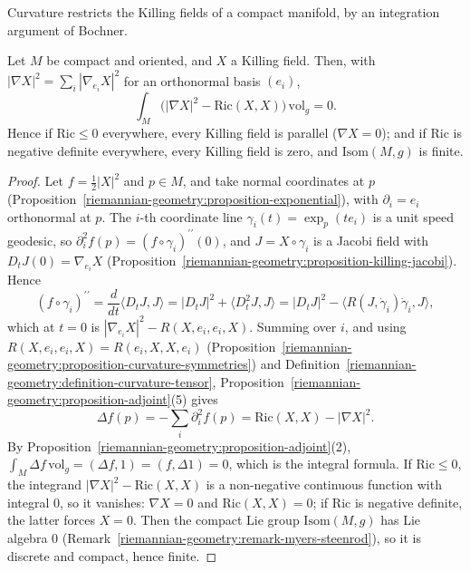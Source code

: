 Curvature restricts the Killing fields of a compact manifold, by an integration argument of Bochner.

\begin{theorem}[Bochner]\label{riemannian-geometry:theorem-bochner-killing}
Let $M$ be compact and oriented, and $X$ a Killing field. Then, with $|\nabla X|^2 = \sum_i|\nabla_{e_i}X|^2$ for an orthonormal basis $(e_i)$,
\[
\int_M\bigl(|\nabla X|^2 - \mathrm{Ric}(X, X)\bigr)\,\mathrm{vol}_g = 0 .
\]
Hence if $\mathrm{Ric} \leq 0$ everywhere, every Killing field is parallel ($\nabla X = 0$); and if $\mathrm{Ric}$ is negative definite everywhere, every Killing field is zero,
and $\mathrm{Isom}(M, g)$ is finite.
\end{theorem}

\begin{proof}
Let $f = \frac12|X|^2$ and $p \in M$, and take normal coordinates at $p$ (Proposition~\ref{riemannian-geometry:proposition-exponential}), with
$\partial_i = e_i$ orthonormal at $p$. The $i$-th coordinate line $\gamma_i(t) = \exp_p(te_i)$ is a unit speed geodesic, so $\partial_i^2f(p) = (f \circ \gamma_i)^{\prime\prime}(0)$,
and $J = X \circ \gamma_i$ is a Jacobi field with $D_tJ(0) = \nabla_{e_i}X$ (Proposition~\ref{riemannian-geometry:proposition-killing-jacobi}). Hence
\[
(f \circ \gamma_i)^{\prime\prime} = \frac{d}{dt}\langle D_tJ, J\rangle = |D_tJ|^2 + \langle D_t^2J, J\rangle = |D_tJ|^2 - \langle R(J, \dot\gamma_i)\dot\gamma_i, J\rangle,
\]
which at $t = 0$ is $|\nabla_{e_i}X|^2 - R(X, e_i, e_i, X)$. Summing over $i$, and using $R(X, e_i, e_i, X) = R(e_i, X, X, e_i)$
(Proposition~\ref{riemannian-geometry:proposition-curvature-symmetries}) and Definition~\ref{riemannian-geometry:definition-curvature-tensor}, Proposition~\ref{riemannian-geometry:proposition-adjoint}(5)
gives
\[
\Delta f(p) = -\sum_i\partial_i^2f(p) = \mathrm{Ric}(X, X) - |\nabla X|^2 .
\]
By Proposition~\ref{riemannian-geometry:proposition-adjoint}(2), $\int_M\Delta f\,\mathrm{vol}_g = (\Delta f, 1) = (f, \Delta1) = 0$, which is the integral formula. If
$\mathrm{Ric} \leq 0$, the integrand $|\nabla X|^2 - \mathrm{Ric}(X, X)$ is a non-negative continuous function with integral $0$, so it vanishes: $\nabla X = 0$ and
$\mathrm{Ric}(X, X) = 0$; if $\mathrm{Ric}$ is negative definite, the latter forces $X = 0$. Then the compact Lie group $\mathrm{Isom}(M, g)$ has Lie algebra $0$
(Remark~\ref{riemannian-geometry:remark-myers-steenrod}), so it is discrete and compact, hence finite.
\end{proof}

